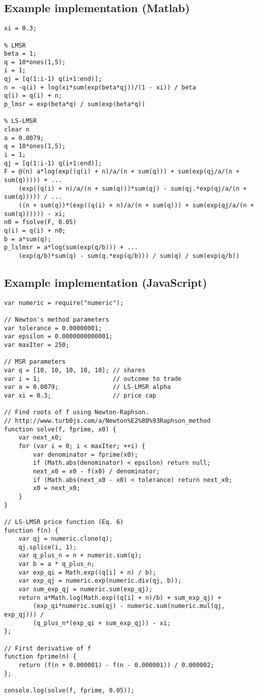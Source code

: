 \documentclass[floatfix,reprint,nofootinbib,amsmath,amssymb,epsfig,pre,floats,letterpaper,groupedaffiliation]{revtex4}
\begin{document}
\subsection*{Example implementation (Matlab)}
\begin{lstlisting}[language=generic]
% price cap
xi = 0.3;

% LMSR
beta = 1;
q = 10*ones(1,5);
i = 1;
qj = [q(1:i-1) q(i+1:end)];
n = -q(i) + log(xi*sum(exp(beta*qj))/(1 - xi)) / beta
q(i) = q(i) + n;
p_lmsr = exp(beta*q) / sum(exp(beta*q))

% LS-LMSR
clear n
a = 0.0079;
q = 10*ones(1,5);
i = 1;
qj = [q(1:i-1) q(i+1:end)];
F = @(n) a*log(exp((q(i) + n)/a/(n + sum(q))) + sum(exp(qj/a/(n + sum(q))))) + ...
    (exp((q(i) + n)/a/(n + sum(q)))*sum(qj) - sum(qj.*exp(qj/a/(n + sum(q))))) / ...
    ((n + sum(q))*(exp((q(i) + n)/a/(n + sum(q))) + sum(exp(qj/a/(n + sum(q)))))) - xi;
n0 = fsolve(F, 0.05)
q(i) = q(i) + n0;
b = a*sum(q);
p_lslmsr = a*log(sum(exp(q/b))) + ...
    (exp(q/b)*sum(q) - sum(q.*exp(q/b))) / sum(q) / sum(exp(q/b))
\end{lstlisting}

\newpage

\subsection*{Example implementation (JavaScript)}
\begin{lstlisting}[language=generic]
var numeric = require("numeric");

// Newton's method parameters
var tolerance = 0.00000001;
var epsilon = 0.0000000000001;
var maxIter = 250;

// MSR parameters
var q = [10, 10, 10, 10, 10]; // shares
var i = 1;                    // outcome to trade
var a = 0.0079;               // LS-LMSR alpha
var xi = 0.3;                 // price cap

// Find roots of f using Newton-Raphson.
// http://www.turb0js.com/a/Newton%E2%80%93Raphson_method
function solve(f, fprime, x0) {
    var next_x0;
    for (var i = 0; i < maxIter; ++i) {
        var denominator = fprime(x0);
        if (Math.abs(denominator) < epsilon) return null;
        next_x0 = x0 - f(x0) / denominator;
        if (Math.abs(next_x0 - x0) < tolerance) return next_x0;
        x0 = next_x0;
    }
}

// LS-LMSR price function (Eq. 6)
function f(n) {
    var qj = numeric.clone(q);
    qj.splice(i, 1);
    var q_plus_n = n + numeric.sum(q);
    var b = a * q_plus_n;
    var exp_qi = Math.exp((q[i] + n) / b);
    var exp_qj = numeric.exp(numeric.div(qj, b));
    var sum_exp_qj = numeric.sum(exp_qj);
    return a*Math.log(Math.exp((q[i] + n)/b) + sum_exp_qj) +
        (exp_qi*numeric.sum(qj) - numeric.sum(numeric.mul(qj, exp_qj))) /
        (q_plus_n*(exp_qi + sum_exp_qj)) - xi;
};

// First derivative of f
function fprime(n) {
    return (f(n + 0.000001) - f(n - 0.000001)) / 0.000002;
};

console.log(solve(f, fprime, 0.05));
\end{lstlisting}
\end{document}
